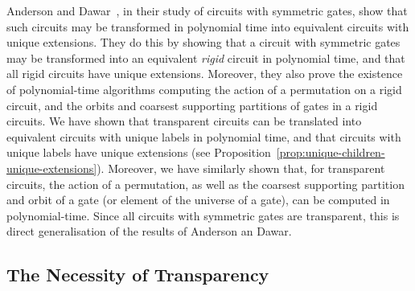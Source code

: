 \documentclass[../paper.tex]{subfiles}
\begin{document}
Anderson and Dawar~\cite{AndersonD17}, in their study of circuits with symmetric
gates, show that such circuits may be transformed in polynomial time into
equivalent circuits with unique extensions. They do this by showing that a
circuit with symmetric gates may be transformed into an equivalent \emph{rigid}
circuit in polynomial time, and that all rigid circuits have unique extensions.
Moreover, they also prove the existence of polynomial-time algorithms computing
the action of a permutation on a rigid circuit, and the orbits and coarsest
supporting partitions of gates in a rigid circuits. We have shown that
transparent circuits can be translated into equivalent circuits with unique
labels in polynomial time, and that circuits with unique labels have unique
extensions (see Proposition~\ref{prop:unique-children-unique-extensions}).
Moreover, we have similarly shown that, for transparent circuits, the action of
a permutation, as well as the coarsest supporting partition and orbit of a gate
(or element of the universe of a gate), can be computed in polynomial-time.
Since all circuits with symmetric gates are transparent, this is direct
generalisation of the results of Anderson an Dawar.

\subsection{The Necessity of Transparency}


\end{document}
